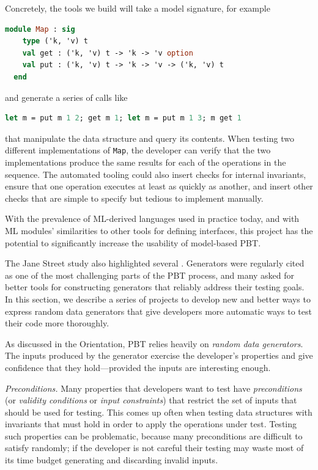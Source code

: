 Concretely, the tools we build will take a model signature, for example
\begin{lstlisting}[language=Caml]
  module Map : sig
    type ('k, 'v) t
    val get : ('k, 'v) t -> 'k -> 'v option
    val put : ('k, 'v) t -> 'k -> 'v -> ('k, 'v) t
  end
\end{lstlisting}
and generate a series of calls like
\begin{lstlisting}[language=Caml]
  let m = put m 1 2; get m 1; let m = put m 1 3; m get 1
\end{lstlisting}
that manipulate the data structure and query its contents.
When testing two
different implementations of \lstinline{Map}, the developer can verify that the
two implementations produce the same results for each of the operations in the
sequence. The automated tooling could also insert checks for internal
invariants, ensure that one operation executes at least as quickly as another,
and insert other checks that are simple to specify but tedious to implement
manually.

With the prevalence of ML-derived languages used in practice today, and with ML
modules' similarities to other tools for defining interfaces, this project has
the potential to significantly increase the usability of model-based
PBT.

%
The Jane Street study also highlighted several .
Generators were regularly cited
as one of the most challenging parts of the
PBT process, and many
asked for better tools for constructing generators that reliably address
their testing goals. In this section, we describe a series of projects
to develop new and better ways to express random data generators that give
developers more automatic ways to test their code more thoroughly.

%
As discussed in the Orientation, PBT relies heavily on {\em random data
generators}. The inputs produced by the generator exercise the developer's
properties and give confidence that they hold---provided the inputs are
interesting enough.

{\em Preconditions.}
Many properties that developers want to test have {\em preconditions}
(or {\em validity conditions} or {\em input constraints}) that
restrict the set of inputs that should be used for testing. This comes up often
when testing data structures with invariants that must hold in order to apply
the operations under test. Testing such properties can be problematic, because
many preconditions are difficult to satisfy randomly; if the developer is not
careful their testing may waste most of its time budget generating and
discarding invalid inputs.


